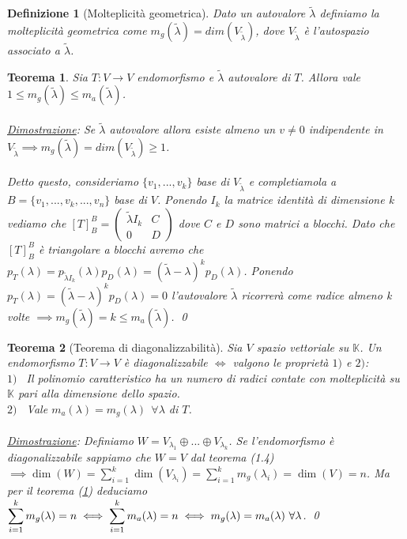 \documentclass[a4paper,12pt]{report}
\newtheorem{teorema}{Teorema}[chapter]
\newtheorem{definizione}{Definizione}[chapter]
\begin{document}
\begin{definizione}[Molteplicità geometrica]
    Dato un autovalore $\widetilde\lambda$ definiamo la molteplicità geometrica come $m_g(\widetilde\lambda )=dim(V_{\widetilde\lambda})$, dove $V_{\widetilde\lambda}$ è l'autospazio associato a $\widetilde\lambda$.
\end{definizione}

\begin{teorema} \label{thm:1.5}
    Sia $T:V \to V$ endomorfismo e $\widetilde\lambda$ autovalore di $T$. Allora vale \\ $1 \le m_g(\widetilde\lambda) \le m_a(\widetilde\lambda)$.
    \\
    \\ \underline{Dimostrazione}: Se $\widetilde\lambda$ autovalore allora esiste almeno un $v \neq 0$ indipendente in $V_{\widetilde\lambda} \implies m_g(\widetilde\lambda)=dim(V_{\widetilde\lambda}) \ge 1$.
    \\
    \\ Detto questo, consideriamo $\{v_1,...,v_k\}$ base di $V_{\widetilde\lambda}$ e completiamola a $B=\{v_1,...,v_k,...,v_n\}$ base di $V$. Ponendo $I_k$ la matrice identità di dimensione k vediamo che $[T]_B^B=\begin{pmatrix}
        \widetilde\lambda I_k & C \\ 0 & D
    \end{pmatrix}$ dove $C$ e $D$ sono matrici a blocchi. Dato che $[T]_B^B$ è triangolare a blocchi avremo che $p_T(\lambda)=p_{\widetilde\lambda I_k}(\lambda)p_D(\lambda)=(\widetilde\lambda-\lambda)^kp_D(\lambda)$. Ponendo $p_T(\lambda)=(\widetilde\lambda-\lambda)^kp_D(\lambda)=0$ l'autovalore $\widetilde\lambda$ ricorrerà come radice almeno k volte $\implies m_g(\widetilde\lambda)=k \le m_a(\widetilde\lambda)$. \qed
\end{teorema}

\begin{teorema}[Teorema di diagonalizzabilità]
    Sia $V$ spazio vettoriale su $\mathbb{K}$. Un endomorfismo $T:V \to V$ è diagonalizzabile $\iff$ valgono le proprietà $1)$ e $2)$:
    \\ $1)$ \ Il polinomio caratteristico ha un numero di radici contate con molteplicità su $\mathbb{K}$ pari alla dimensione dello spazio.
    \\ $2)$ \ Vale $m_a(\lambda)=m_g(\lambda) \  \ \forall\lambda $ di $T$.
    \\
    \\ \underline{Dimostrazione}: Definiamo $W=V_{\lambda_1} \oplus...\oplus V_{\lambda_k}$. Se l'endomorfismo è diagonalizzabile sappiamo che $W=V$ dal teorema (1.4) $\implies \dim(W)=\displaystyle \sum_{i=1}^{k}\dim(V_{\lambda_i})=\sum_{i=1}^{k}m_g(\lambda_i)=\dim(V)=n$. Ma per il teorema (\ref{thm:1.5}) deduciamo $\displaystyle\sum_{i=1}^{k}m_g(\lambda)=n \iff \sum_{i=1}^{k}m_a(\lambda)=n\\ \iff m_g(\lambda)=m_a(\lambda) \ \forall\lambda$. \qed
\end{teorema}
\end{document}
